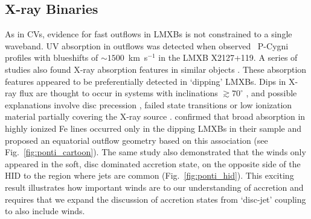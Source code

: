 

\subsection{X-ray Binaries}
\label{sec:xrb_winds}

As in CVs, evidence for fast outflows in LMXBs is not constrained to 
a single waveband. UV absorption in outflows was detected when
\cite{ioannau2003} observed \civfull\ P-Cygni profiles with blueshifts 
of $\sim1500$~km~s$^{-1}$ in the LMXB X2127+119. 
A series of studies also found X-ray absorption features in similar objects 
\citep{ueda1998,kotani2000,parmar2002}. 
These absorption features appeared to be preferentially detected
in `dipping' LMXBs. Dips in X-ray flux are thought to occur
in systems with inclinations $\gtrsim70^\circ$ 
\citep{vanderhooft1998,tanaka2003,church2005}, and possible explanations
involve disc precession \citep{barnard2006,shaw2013}, 
failed state transitions \citep{soleri2013,shaw2016} or low ionization material 
partially covering the X-ray source \citep{tanaka2003}.
\cite{ponti2012} confirmed that broad absorption in highly ionized Fe lines 
occurred only in the dipping LMXBs in their sample and proposed an equatorial 
outflow geometry based on this association (see Fig.~\ref{fig:ponti_cartoon}). 
The same study also demonstrated that the winds only appeared in the soft, 
disc dominated accretion state, on the opposite side of the HID to the
region where jets are common (Fig.~\ref{fig:ponti_hid}). 
This exciting result illustrates how
important winds are to our understanding of accretion and requires that
we expand the discussion of accretion states from `disc-jet' coupling
to also include winds.

